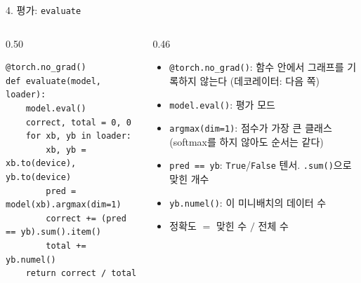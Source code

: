 \documentclass[aspectratio=169,11pt]{beamer}
\newcommand{\code}[1]{\texttt{#1}}
\begin{document}
\begin{frame}[fragile]{4. 평가: \code{evaluate}}
\begin{columns}[T,onlytextwidth]
\begin{column}{0.50\textwidth}
\begin{lstlisting}
@torch.no_grad()
def evaluate(model, loader):
    model.eval()
    correct, total = 0, 0
    for xb, yb in loader:
        xb, yb = xb.to(device), yb.to(device)
        pred = model(xb).argmax(dim=1)
        correct += (pred == yb).sum().item()
        total += yb.numel()
    return correct / total
\end{lstlisting}
\end{column}
\begin{column}{0.46\textwidth}
\small
\begin{itemize}
\item \code{@torch.no\_grad()}: 함수 안에서 그래프를 기록하지 않는다 (데코레이터: 다음 쪽)
\item \code{model.eval()}: 평가 모드
\item \code{argmax(dim=1)}: 점수가 가장 큰 클래스 (softmax를 하지 않아도 순서는 같다)
\item \code{pred == yb}: \code{True}/\code{False} 텐서. \code{.sum()}으로 맞힌 개수
\item \code{yb.numel()}: 이 미니배치의 데이터 수
\item 정확도 $=$ 맞힌 수 $/$ 전체 수
\end{itemize}
\end{column}
\end{columns}
\end{frame}
\end{document}
